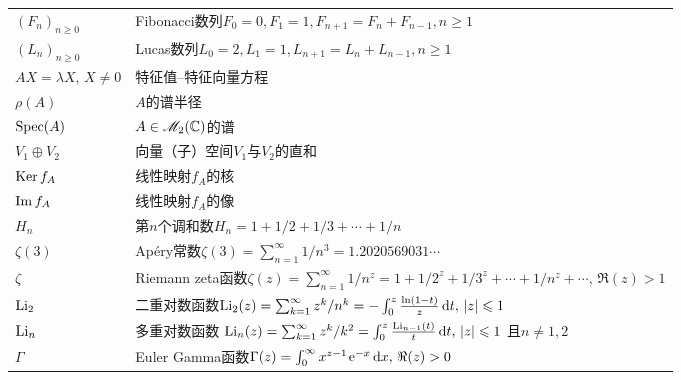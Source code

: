 \begin{longtable}{p{}p{}}
 $(F_n)_{n\ge0}$ & Fibonacci数列$F_0=0,F_1=1,F_{n+1}=F_n+F_{n-1},n\ge1$ \\
 $(L_n)_{n\ge0}$ & Lucas数列$L_0=2,L_1=1,L_{n+1}=L_n+L_{n-1},n\ge1$ \\
 $AX=\lambda X,\,X\ne 0$ & 特征值{--}特征向量方程 \\
 $\rho(A)$     & $A$的谱半径 \\
 $\operatorname{Spec}(A)$    & $A\in\mathscr M_2(\mathbb C)$的谱 \\
 $V_1\oplus V_2$ & 向量（子）空间$V_1$与$V_2$的直和 \\
 $\operatorname{Ker} f_A$      & 线性映射$f_A$的核 \\
 $\operatorname{Im} f_A$       & 线性映射$f_A$的像 \\
 $H_n$           & 第$n$个调和数$H_n=1+1/2+1/3+\cdots+1/n$ \\
 $\zeta(3)$      & Ap\'ery常数$\zeta(3)=\sum_{n=1}^\infty 1/n^3=1.2020569031\cdots$\\
 $\zeta$         & Riemann zeta函数$\zeta(z)=\sum_{n=1}^\infty1/n^z=1+1/2^z+1/3^z+\cdots+1/n^z+\cdots,\,\Re(z)>1$\\
 $\operatorname{Li}_2$         & 二重对数函数$\operatorname{Li}_2(z)=\sum_{k=1}^\infty z^k/n^k=-\int_0^z\frac{\ln(1-t)}z\mathop{}\!\mathrm d t,\,|z|\leqslant1$ \\
 $\operatorname{Li}_n$         & 多重对数函数 $\operatorname{Li}_n(z)=\sum_{k=1}^\infty z^k/k^2=\int_0^z\frac{\operatorname{Li}_{n-1}(t)}t\mathop{}\!\mathrm d t,\,|z|\leqslant1$ 且$n\ne1,2$ \\
 $\Gamma$        & Euler Gamma函数$\Gamma(z)=\int_0^\infty x^{z-1}\operatorname{\!\!\;\mathrm e}^{-x}\mathop{}\!\mathrm d x,\,\Re(z)>0$
\end{longtable} 